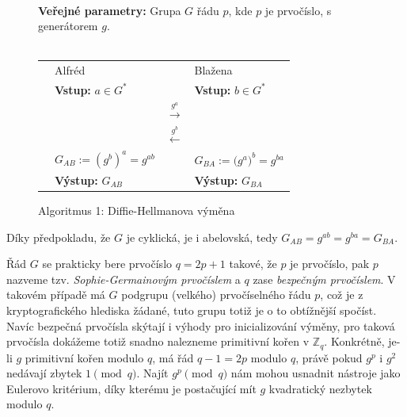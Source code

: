\documentclass [12pt]{report}
\begin{document}
\begin{figure}[h]
\begin{center} 
\makebox[1cm]{\rule{15cm}{0.4pt}}\\
\hspace{-1.35cm} \textbf{Veřejné parametry:} Grupa $G$ řádu $p$, kde $p$ je prvočíslo, s generátorem $g$.\\

\vspace{-0.25cm}
\makebox[\linewidth]{\rule{15cm}{0.4pt}}\\
\vspace{0.2cm}
\begin{tabular}{l l c l}
\cline{2-2} \cline{4-4} 
& Alfréd & & Blažena \\ 
\cline{2-2} \cline{4-4} 
& \textbf{Vstup:} $a \in G^{*}$ & & \textbf{Vstup:} $b \in G^{*}$ \\
 & & $\stackrel{g^a}{\longrightarrow} $ &  \\
&  & $\stackrel{g^b}{\longleftarrow} $ &  \\
& $G_{AB} := \left(g^b\right)^{a} = g^{ab}$ &  & $ G_{BA} := \big(g^a\big)^{b} = g^{ba}$ \\
& \textbf{Výstup:} $G_{AB}$ & & \textbf{Výstup:} $G_{BA}$
\end{tabular}
\caption*{Algoritmus 1: Diffie-Hellmanova výměna}
\vspace{-0.3cm}
\end{center}
\end{figure}

Díky předpokladu, že $G$ je cyklická, je i abelovská, tedy $G_{AB} = g^{ab} = g^{ba} = G_{BA}$.\\ 
\begin{center} 
\end{center}

Řád $G$ se prakticky bere prvočíslo $q = 2p+1$ takové, že $p$ je prvočíslo, pak $p$ nazveme tzv. \textit{Sophie-Germainovým prvočíslem} a $q$ zase \textit{bezpečným prvočíslem}. V takovém případě má $G$ podgrupu (velkého) prvočíselného řádu $p$, což je z kryptografického hlediska žádané, tuto grupu totiž je o to obtížnější spočíst. Navíc bezpečná prvočísla skýtají i výhody pro inicializování výměny, pro taková prvočísla dokážeme totiž snadno nalezneme primitivní kořen v $\mathbb{Z}_q$. Konkrétně, je-li $g$ primitivní kořen modulo $q$, má řád $q-1 = 2p$ modulo $q$, právě pokud $g^{p}$ i $g^2$ nedávají zbytek $1 \pmod{q}$. Najít $g^{p} \pmod{q}$ nám mohou usnadnit nástroje jako Eulerovo kritérium, díky kterému je postačující mít $g$ kvadratický nezbytek modulo $q$.\\
\end{document}
